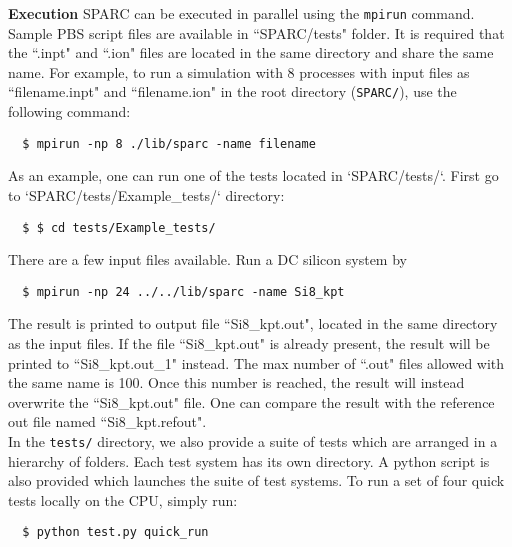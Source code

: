   \begin{frame}{\textbf{Execution}} \label{Execution}
  SPARC can be executed in parallel using the \texttt{mpirun} command. Sample PBS script files are available in ``SPARC/tests" folder. It is required that the ``.inpt" and ``.ion" files are located in the same directory and share the same name. For example, to run a simulation with 8 processes with input files as ``filename.inpt" and ``filename.ion" in the root directory (\texttt{SPARC/}), use the following command:
  \begin{verbatim}
  $ mpirun -np 8 ./lib/sparc -name filename
  \end{verbatim} 
  As an example, one can run one of the tests located in `SPARC/tests/`. First go to `SPARC/tests/Example\_tests/` directory:
  \begin{verbatim}
  $ $ cd tests/Example_tests/
  \end{verbatim} 
  There are a few input files available. Run a DC silicon system by
  \begin{verbatim}
  $ mpirun -np 24 ../../lib/sparc -name Si8_kpt
  \end{verbatim} 
  
  The result is printed to output file ``Si8\_kpt.out", located in the same directory as the input files. If the file ``Si8\_kpt.out" is already present, the result will be printed to ``Si8\_kpt.out\_1" instead. The max number of ``.out" files allowed with the same name is 100. Once this number is reached, the result will instead overwrite the ``Si8\_kpt.out" file. One can compare the result with the reference out file named ``Si8\_kpt.refout".\\%
  
  
  \hspace{3mm} In the \texttt{tests/} directory, we also provide a suite of tests which are arranged in a hierarchy of folders. Each test system has its own directory. A python script is also provided which launches the suite of test systems. To run a set of four quick tests locally on the CPU, simply run: 
  \begin{verbatim}
  $ python test.py quick_run
  \end{verbatim} 
  

\end{frame}
